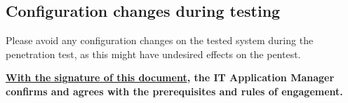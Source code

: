 \subsection*{Configuration changes during testing}
Please avoid any configuration changes on the tested system during the penetration test, as this might have undesired effects on the pentest.



\vskip 0.3in
\begin{tcolorbox}[colback=red!5!white,colframe=red!75!black]
    \textbf{\large \underline{With the signature of this document}, the IT Application Manager confirms and agrees with the prerequisites and rules of engagement.}
  \end{tcolorbox}
